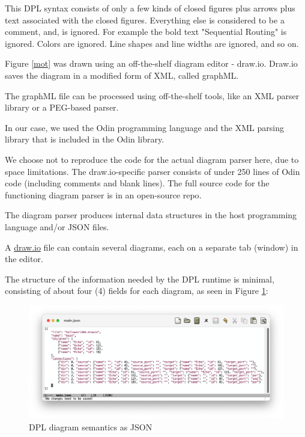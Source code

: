 \documentclass[10pt,anonymous,review]{acmart}
\begin{document}
This DPL syntax consists of only a few kinds of closed figures plus
arrows plus text associated with the closed figures. Everything else is
considered to be a comment, and, is ignored. For example the bold text
"Sequential Routing" is ignored. Colors are ignored. Line shapes and
line widths are ignored, and so on.

Figure \ref{mot} was drawn using an off-the-shelf diagram editor -
draw.io\cite{diagrams_net}. Draw.io saves the diagram in a modified form of XML, called graphML\cite{graphml}.

The graphML file can be processed using off-the-shelf tools, like an XML parser library or a PEG\cite{peg}-based parser\cite{ohmjs}.

In our case, we used the Odin programming language\cite{odin} and the XML parsing library that is included in the Odin library.

We choose not to reproduce the code for the actual diagram parser here, due to space limitations. The draw.io-specific parser consists of under 250 lines of Odin code (including comments and blank lines). The full source code for the functioning diagram parser is in an open-source repo\cite{d2j}.

The diagram parser produces internal data structures in the host programming language and/or JSON\cite{json} files.

A \href{http://draw.io}{draw.io} file can contain several diagrams, each on a separate tab (window) in the editor.

The structure of the information needed by the DPL runtime is minimal, consisting of about four (4) fields for each diagram, as seen in Figure \ref{main}:

\vspace{0.5\baselineskip}

\begin{figure}[h]
    \includegraphics[trim=1cm 1.9cm 1.5cm 0.8cm, clip, scale=0.4]{./media/main.png}
    \caption{DPL diagram semantics as JSON}
    \label{main}
\end{figure}
\end{document}

